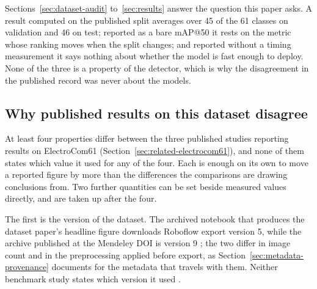 %
%

Sections~\ref{sec:dataset-audit} to~\ref{sec:results} answer the question this
paper asks. A result computed on the published split averages over 45 of the 61
classes on validation and 46 on test; reported as a bare mAP@50 it rests on the
metric whose ranking moves when the split changes; and reported without a timing
measurement it says nothing about whether the model is fast enough to deploy. None of the three is a property of the detector, which is
why the disagreement in the published record was never about the models.

\subsection{Why published results on this dataset disagree}
\label{sec:disagreement}

At least four properties differ between the three published studies reporting
results on ElectroCom61 (Section~\ref{sec:related-electrocom61}), and none of
them states which value it used for any of the four. Each is enough on its own to
move a reported figure by more than the differences the comparisons are drawing
conclusions from. Two further quantities can be set beside measured values
directly, and are taken up after the four.

The first is the version of the dataset. The archived notebook that produces the
dataset paper's headline figure downloads Roboflow export version 5, while the
archive published at the Mendeley DOI is version 9 \citep{electrocom61}; the two
differ in image count and in the preprocessing applied before export, as
Section~\ref{sec:metadata-provenance} documents for the metadata that travels
with them. Neither benchmark study states which version it used
\citep{yolov12paper,yolov13paper}.

